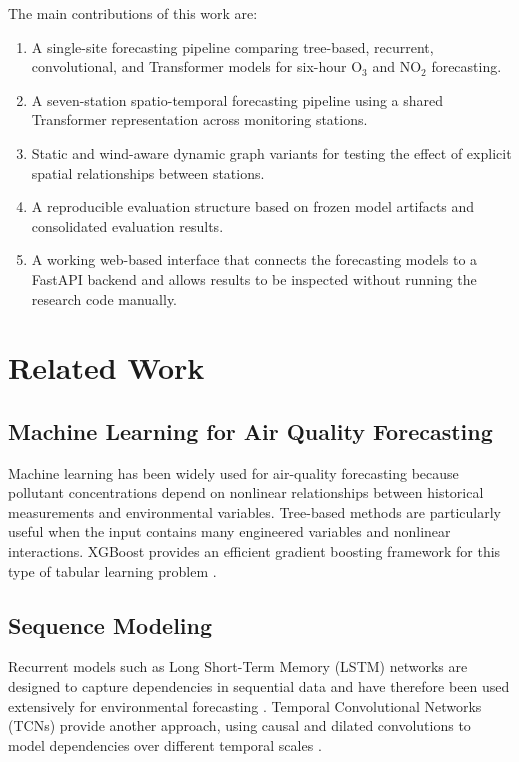 \documentclass[conference]{IEEEtran}
\begin{document}
The main contributions of this work are:

\begin{enumerate}
\item A single-site forecasting pipeline comparing tree-based, recurrent, convolutional,
and Transformer models for six-hour O$_3$ and NO$_2$ forecasting.
\item A seven-station spatio-temporal forecasting pipeline using a shared Transformer
representation across monitoring stations.
\item Static and wind-aware dynamic graph variants for testing the effect of explicit
spatial relationships between stations.
\item A reproducible evaluation structure based on frozen model artifacts and consolidated
evaluation results.
\item A working web-based interface that connects the forecasting models to a FastAPI
backend and allows results to be inspected without running the research code manually.
\end{enumerate}

\section{Related Work}

\subsection{Machine Learning for Air Quality Forecasting}

Machine learning has been widely used for air-quality forecasting because pollutant
concentrations depend on nonlinear relationships between historical measurements and
environmental variables. Tree-based methods are particularly useful when the input contains
many engineered variables and nonlinear interactions. XGBoost provides an efficient gradient
boosting framework for this type of tabular learning problem \cite{xgboost}.

\subsection{Sequence Modeling}

Recurrent models such as Long Short-Term Memory (LSTM) networks are designed to capture
dependencies in sequential data and have therefore been used extensively for environmental
forecasting \cite{lstm}. Temporal Convolutional Networks (TCNs) provide another approach,
using causal and dilated convolutions to model dependencies over different temporal scales
\cite{tcn}.
\end{document}
